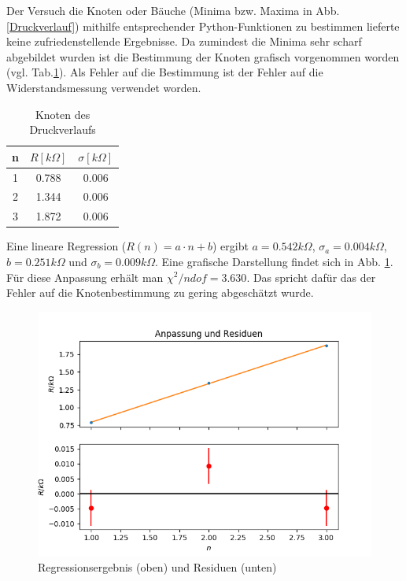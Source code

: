 \documentclass[12pt,a4paper]{article}
\begin{document}
Der Versuch die Knoten oder Bäuche (Minima bzw. Maxima in Abb. \ref{Druckverlauf}) mithilfe entsprechender Python-Funktionen zu bestimmen lieferte keine zufriedenstellende Ergebnisse.
Da zumindest die Minima sehr scharf abgebildet wurden ist die Bestimmung der Knoten grafisch vorgenommen worden (vgl. Tab.\ref{tab:Druckknoten}). Als Fehler auf die Bestimmung ist der Fehler auf die Widerstandsmessung verwendet worden.

\begin{table}
\begin{center}
\begin{tabular}{|c|c|c|}
\hline 
n & $R[k\Omega]$ & $\sigma[k\Omega]$ \\ 
\hline 
1 & 0.788  & 0.006 \\ 
\hline 
2 & 1.344  & 0.006 \\ 
\hline 
3 & 1.872 & 0.006 \\ 
\hline 
\end{tabular}
\caption[Druckknoten]{Knoten des Druckverlaufs}
\label{tab:Druckknoten}
\end{center}
\end{table}

Eine lineare Regression ($R(n)=a \cdot n+b$) ergibt $a=0.542k\Omega$, $\sigma_{a}=0.004k\Omega$, $b=0.251k\Omega$ und $\sigma_b=0.009k\Omega$. Eine grafische Darstellung findet sich in Abb. \ref{fig:Regression Druckverlauf}.\\
Für diese Anpassung erhält man $\chi^2/ndof=3.630$. Das spricht dafür das der Fehler auf die Knotenbestimmung zu gering abgeschätzt wurde.

\begin{figure}
\includegraphics[width=\linewidth]{fitdruckknoten}
\caption[Regression Knoten]{Regressionsergebnis (oben) und Residuen (unten)}
\label{fig:Regression Druckverlauf}
\end{figure}
\end{document}
